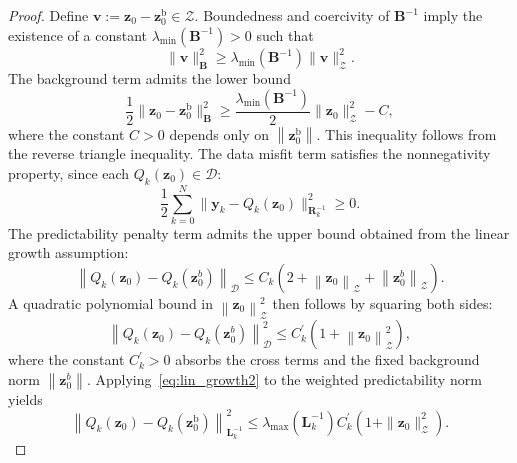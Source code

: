 \documentclass[final,1p,times]{elsarticle}
\begin{document}
\begin{proof}
Define $ \mathbf{v} := \mathbf{z}_0 - \mathbf{z}_0^{\mathrm{b}} \in \mathcal{Z} $. Boundedness and coercivity of $ \mathbf{B}^{-1} $ imply the existence of a constant $ \lambda_{\min}\left(\mathbf{B}^{-1}\right) > 0 $ such that
\begin{equation}
\| \mathbf{v} \|_{\mathbf{B}}^2 \geq \lambda_{\min}\left(\mathbf{B}^{-1}\right) \| \mathbf{v} \|_{\mathcal{Z}}^2.
\end{equation}
The background term admits the lower bound
\begin{equation}
\frac{1}{2} \| \mathbf{z}_0 - \mathbf{z}_0^{\mathrm{b}} \|_{\mathbf{B}}^2 \geq \frac{\lambda_{\min}\left(\mathbf{B}^{-1}\right)}{2} \| \mathbf{z}_0 \|_{\mathcal{Z}}^2 - C,
\end{equation}
where the constant $ C > 0 $ depends only on $ \left\| \mathbf{z}_0^{\mathrm{b}} \right\| $. This inequality follows from the reverse triangle inequality. The data misfit term satisfies the nonnegativity property, since each $ Q_k(\mathbf{z}_0) \in \mathcal{D} $:
\begin{equation}
\frac{1}{2} \sum_{k=0}^N \| \mathbf{y}_k - Q_k(\mathbf{z}_0) \|_{\mathbf{R}^{-1}_k}^2 \geq 0.
\end{equation}
The predictability penalty term admits the upper bound obtained from the linear growth assumption:
\begin{equation}
\left\|Q_k\left(\mathbf{z}_0\right)-Q_k\left(\mathbf{z}_0^b\right)\right\|_{\mathcal{D}} \leq C_k\left(2+\left\|\mathbf{z}_0\right\|_{\mathcal{Z}}+\left\|\mathbf{z}_0^b\right\|_{\mathcal{Z}}\right).
\end{equation}
A quadratic polynomial bound in $ \left\| \mathbf{z}_0 \right\|_{\mathcal{Z}}^2 $ then follows by squaring both sides:
\begin{equation}
\left\|Q_k\left(\mathbf{z}_0\right)-Q_k\left(\mathbf{z}_0^b\right)\right\|_{\mathcal{D}}^2 \leq C_k^{\prime}\left(1+\left\|\mathbf{z}_0\right\|_{\mathcal{Z}}^2\right),     \label{eq:lin_growth2}
\end{equation}
where the constant $ C_k^{\prime} > 0 $ absorbs the cross terms and the fixed background norm $ \left\| \mathbf{z}_0^b \right\| $.
Applying~\eqref{eq:lin_growth2} to the weighted predictability norm yields
\begin{equation}
\left\| Q_k(\mathbf{z}_0) - Q_k(\mathbf{z}_0^{\mathrm{b}}) \right\|_{\mathbf{L}^{-1}_k}^2 \leq \lambda_{\max }\left(\mathbf{L}_k^{-1}\right)C^{\prime}_k(1 + \| \mathbf{z}_0 \|_{\mathcal{Z}}^2).
\end{equation}

\end{proof}
\end{document}
